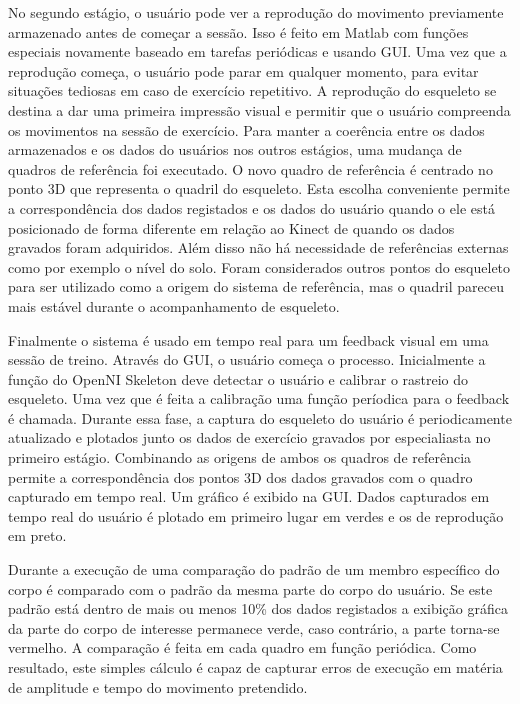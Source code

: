 No segundo estágio, o usuário pode ver a reprodução do movimento previamente armazenado
antes de começar a sessão. Isso é feito em Matlab com funções especiais novamente
baseado em tarefas periódicas e usando GUI. Uma vez que a reprodução começa, o usuário
pode parar em qualquer momento, para evitar situações tediosas em caso de exercício
repetitivo. A reprodução do esqueleto se destina a dar uma primeira impressão visual
e permitir que o usuário compreenda os movimentos na sessão de exercício. Para manter
a coerência entre os dados armazenados e os dados do usuários nos outros estágios,
uma mudança de quadros de referência foi executado. O novo quadro de referência
é centrado no ponto 3D que representa o quadril do esqueleto.
Esta escolha conveniente permite a correspondência dos dados registados e os dados
 do usuário quando o ele está posicionado de forma diferente em relação ao Kinect
 de quando os dados gravados foram adquiridos. Além disso não há necessidade
de referências externas como por exemplo o nível do solo. Foram considerados outros
 pontos do esqueleto para ser utilizado como a origem do sistema de referência,
mas o quadril pareceu mais estável durante o acompanhamento de esqueleto.

Finalmente o sistema é usado em tempo real para um feedback visual em uma sessão
de treino. Através do GUI, o usuário começa o processo. Inicialmente a função do
 OpenNI Skeleton deve detectar o usuário e calibrar o rastreio do esqueleto. Uma
vez que é feita a calibração uma função períodica para o feedback é chamada. Durante
essa fase, a captura do esqueleto do usuário é periodicamente atualizado e plotados
junto os dados de exercício gravados por especialiasta no primeiro estágio. Combinando
 as origens de ambos os quadros de referência permite a correspondência dos pontos 3D
 dos dados gravados com o quadro capturado em tempo real. Um gráfico é exibido na GUI.
 Dados capturados em tempo real do usuário é plotado em primeiro lugar em verdes
e os de reprodução em preto.

Durante a execução de uma comparação do padrão de um membro específico do corpo
 é comparado com o padrão da mesma parte do corpo do usuário. Se este padrão está
 dentro de mais ou menos 10\% dos dados registados a exibição gráfica da parte
do corpo de interesse permanece verde, caso contrário, a parte torna-se vermelho.
A comparação é feita em cada quadro em função periódica. Como resultado, este simples
cálculo é capaz de capturar erros de execução em matéria de amplitude e tempo do
movimento pretendido.\cite{roberto}


